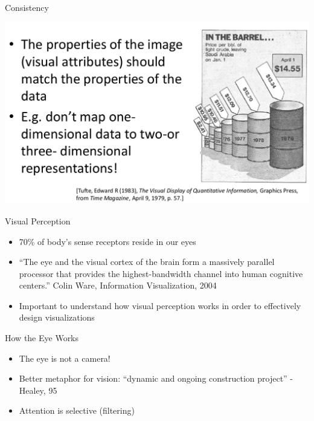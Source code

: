 \documentclass{beamer}
\begin{document}
\begin{frame}{Consistency}
    \begin{center}
        \includegraphics[scale=0.3]{mackinlayConsistency.png}
    \end{center}
\end{frame}  


\begin{frame}{Visual Perception} 
    \begin{itemize}
        \item 70\% of body's sense receptors reside in our eyes
        \item ``The eye and the visual cortex of the brain form a massively parallel processor that provides the highest-bandwidth channel into human cognitive centers.'' Colin Ware, Information Visualization, 2004
        \item Important to understand how visual perception works in order to effectively design visualizations
    \end{itemize}
\end{frame}  


\begin{frame}{How the Eye Works} 
    \begin{itemize}
        \item The eye is not a camera!
        \item Better metaphor for vision: ``dynamic and ongoing construction project'' - Healey, 95
        \item Attention is selective (filtering)
    \end{itemize}
\end{frame}  
\end{document}
